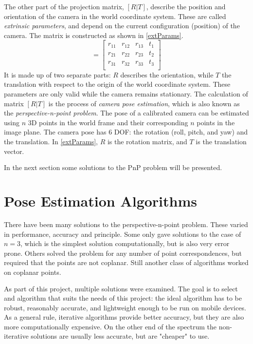 The other part of the projection matrix, $[R | T]$, describe the position and orientation of the camera in the world coordinate system.
These are called \textit{extrinsic parameters}, and depend on the current configuration (position) of the camera.
The matrix is constructed as shown in \eqref{extParams}.
\begin{equation}
	[R | T] =
	\begin{bmatrix}
		r_{11} & r_{12} & r_{13} & t_1\\
		r_{21} & r_{22} & r_{23} & t_2\\
		r_{31} & r_{32} & r_{33} & t_3\\
	\end{bmatrix}
	\label{eq:extParams}
\end{equation}
It is made up of two separate parts: $R$ describes the orientation, while $T$ the translation with respect to the origin of the world coordinate system.
These parameters are only valid while the camera remains stationary.
The calculation of matrix $[R|T]$ is the process of \textit{camera pose estimation}, which is also known as the \textit{perspective-n-point problem}.
The pose of a calibrated camera can be estimated using $n$ 3D points in the world frame and their corresponding $n$ points in the image plane.
The camera pose has 6 DOF: the rotation (roll, pitch, and yaw) and the translation.
In \eqref{extParams}, $R$ is the rotation matrix, and $T$ is the translation vector.

In the next section some solutions to the PnP problem will be presented.

\section{Pose Estimation Algorithms}

There have been many solutions to the perspective-n-point problem.
These varied in performance, accuracy and principle.
Some only gave solutions to the case of $n=3$, which is the simplest solution computationally, but is also very error prone. 
Others solved the problem for any number of point correspondences, but required that the points are not coplanar.
Still another class of algorithms worked on coplanar points.

As part of this project, multiple solutions were examined.
The goal is to select and algorithm that suits the needs of this project: the ideal algorithm has to be robust, reasonably accurate, and lightweight enough to be run on mobile devices.
As a general rule, iterative algorithms provide better accuracy, but they are also more computationally expensive.
On the other end of the spectrum the non-iterative solutions are usually less accurate, but are "cheaper" to use.

